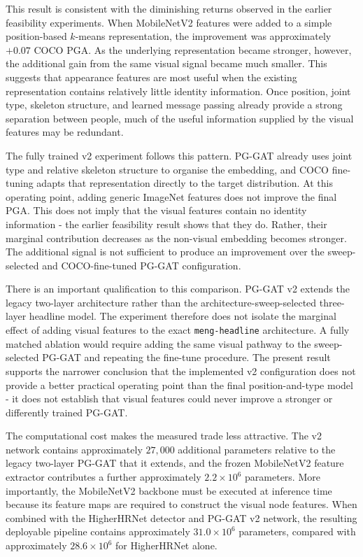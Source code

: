 This result is consistent with the diminishing returns observed in the
earlier feasibility experiments.
When MobileNetV2 features were added to a simple position-based
$k$-means representation, the improvement was approximately $+0.07$
COCO PGA.
As the underlying representation became stronger, however,
the additional gain from the same visual signal became much smaller.
This suggests that appearance features are most useful when the existing
representation contains relatively little identity information.
Once position, joint type, skeleton structure, and learned message
passing already provide a strong separation between people, much of the
useful information supplied by the visual features may be redundant.

The fully trained v2 experiment follows this pattern.
PG-GAT already uses joint type and relative skeleton structure to
organise the embedding,
and COCO fine-tuning adapts that representation directly to the target
distribution.
At this operating point, adding generic ImageNet features does not
improve the final PGA.
This does not imply that the visual features contain no identity
information - the earlier feasibility result shows that they do.
Rather, their marginal contribution decreases as the non-visual
embedding becomes stronger.
The additional signal is not sufficient to produce an improvement over
the sweep-selected and COCO-fine-tuned PG-GAT configuration.

There is an important qualification to this comparison.
PG-GAT v2 extends the legacy two-layer architecture rather than the
architecture-sweep-selected three-layer headline model.
The experiment therefore does not isolate the marginal effect of adding
visual features to the exact \texttt{meng-headline} architecture.
A fully matched ablation would require adding the same visual pathway
to the sweep-selected PG-GAT and repeating the fine-tune procedure.
The present result supports the narrower conclusion that the implemented
v2 configuration does not provide a better practical operating point
than the final position-and-type model -
it does not establish that visual features could never improve a
stronger or differently trained PG-GAT.

The computational cost makes the measured trade less attractive.
The v2 network contains approximately $27{,}000$ additional parameters
relative to the legacy two-layer PG-GAT that it extends,
and the frozen MobileNetV2 feature extractor contributes a further
approximately $2.2 \times 10^{6}$ parameters.
More importantly, the MobileNetV2 backbone must be executed at
inference time because its feature maps are required to construct the
visual node features.
When combined with the HigherHRNet detector and PG-GAT v2 network,
the resulting deployable pipeline contains approximately
$31.0 \times 10^{6}$ parameters,
compared with approximately $28.6 \times 10^{6}$ for HigherHRNet alone.

